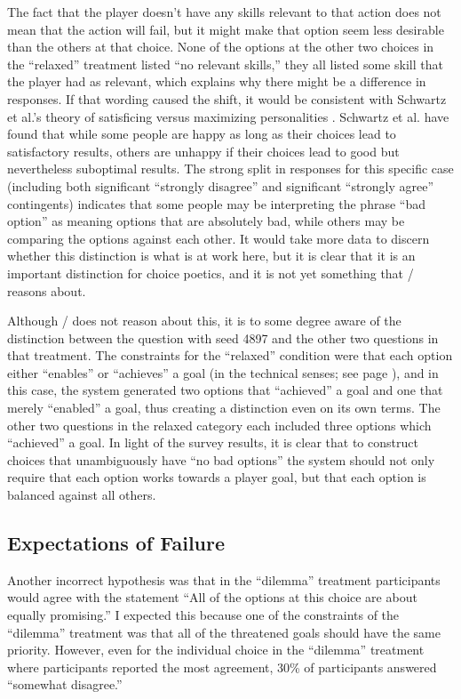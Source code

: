 The fact that the player doesn't have any skills relevant to that action does not mean that the action will fail, but it might make that option seem less desirable than the others at that choice.
%
None of the options at the other two choices in the ``relaxed'' treatment listed ``no relevant skills,'' they all listed some skill that the player had as relevant, which explains why there might be a difference in responses.
%
If that wording caused the shift, it would be consistent with Schwartz et al.'s theory of satisficing versus maximizing personalities \citep{Schwartz2002}.
%
Schwartz et al. have found that while some people are happy as long as their choices lead to satisfactory results, others are unhappy if their choices lead to good but nevertheless suboptimal results.
%
The strong split in responses for this specific case (including both significant ``strongly disagree'' and significant ``strongly agree'' contingents) indicates that some people may be interpreting the phrase ``bad option'' as meaning options that are absolutely bad, while others may be comparing the options against each other.
%
It would take more data to discern whether this distinction is what is at work here, but it is clear that it is an important distinction for choice poetics, and it is not yet something that \dunyazad/ reasons about.


Although \dunyazad/ does not reason about this, it is to some degree aware of the distinction between the question with seed 4897 and the other two questions in that treatment.
%
The constraints for the ``relaxed'' condition were that each option either ``enables'' or ``achieves'' a goal (in the technical senses; see page \pageref{page:choicetypes}), and in this case, the system generated two options that ``achieved'' a goal and one that merely ``enabled'' a goal, thus creating a distinction even on its own terms.
%
The other two questions in the relaxed category each included three options which ``achieved'' a goal.
%
In light of the survey results, it is clear that to construct choices that unambiguously have ``no bad options'' the system should not only require that each option works towards a player goal, but that each option is balanced against all others.


\subsection{Expectations of Failure}

Another incorrect hypothesis was that in the ``dilemma'' treatment participants would agree with the statement ``All of the options at this choice are about equally promising.''
%
I expected this because one of the constraints of the ``dilemma'' treatment was that all of the threatened goals should have the same priority.
%
However, even for the individual choice in the ``dilemma'' treatment where participants reported the most agreement, 30\% of participants answered ``somewhat disagree.'' 


